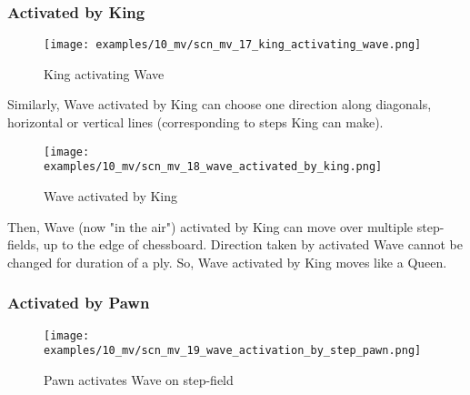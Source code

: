 \subsubsection*{Activated by King}
\label{sec:Miranda's veil/Wave/Movement/Activated by King}

\vspace*{-1.4\baselineskip}
\noindent
\begin{figure}[h]
\texttt{[image: examples/10\_mv/scn\_mv\_17\_king\_activating\_wave.png]}
\caption{King activating Wave}
\label{fig:scn_mv_17_king_activating_wave}
\end{figure}

Similarly, Wave activated by King can choose one direction along diagonals, horizontal
or vertical lines (corresponding to steps King can make).

\clearpage %

\vspace*{-2.1\baselineskip}
\noindent
\begin{figure}[!h]
\texttt{[image: examples/10\_mv/scn\_mv\_18\_wave\_activated\_by\_king.png]}
\caption{Wave activated by King}
\label{fig:scn_mv_18_wave_activated_by_king}
\end{figure}

Then, Wave (now "in the air") activated by King can move over multiple step-fields,
up to the edge of chessboard. Direction taken by activated Wave cannot be changed
for duration of a ply. So, Wave activated by King moves like a Queen.

\clearpage %

\subsubsection*{Activated by Pawn}
\label{sec:Miranda's veil/Wave/Movement/Activated by Pawn}

\vspace*{-1.5\baselineskip}
\noindent
\begin{figure}[!h]
\texttt{[image: examples/10\_mv/scn\_mv\_19\_wave\_activation\_by\_step\_pawn.png]}
\vspace*{-1.3\baselineskip}
\caption{Pawn activates Wave on step-field}
\label{fig:scn_mv_19_wave_activation_by_step_pawn}
\end{figure}

